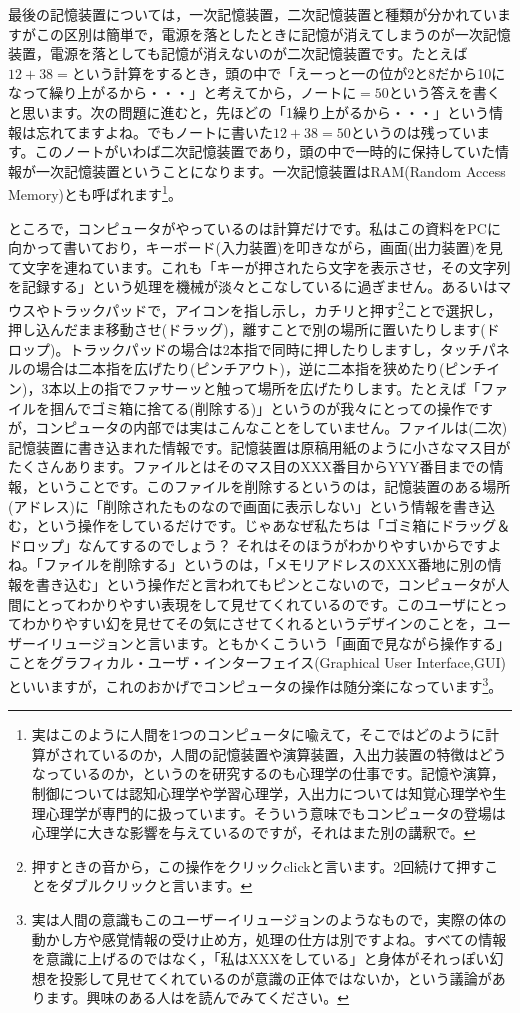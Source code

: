 \documentclass{ltjsbook}
\begin{document}
最後の記憶装置については，一次記憶装置，二次記憶装置と種類が分かれていますがこの区別は簡単で，電源を落としたときに記憶が消えてしまうのが一次記憶装置，電源を落としても記憶が消えないのが二次記憶装置です。たとえば$12+38=$という計算をするとき，頭の中で「えーっと一の位が2と8だから10になって繰り上がるから・・・」と考えてから，ノートに$=50$という答えを書くと思います。次の問題に進むと，先ほどの「1繰り上がるから・・・」という情報は忘れてますよね。でもノートに書いた$12+38=50$というのは残っています。このノートがいわば二次記憶装置であり，頭の中で一時的に保持していた情報が一次記憶装置ということになります。一次記憶装置はRAM(Random Access Memory)とも呼ばれます\footnote{実はこのように人間を1つのコンピュータに喩えて，そこではどのように計算がされているのか，人間の記憶装置や演算装置，入出力装置の特徴はどうなっているのか，というのを研究するのも心理学の仕事です。記憶や演算，制御については認知心理学や学習心理学，入出力については知覚心理学や生理心理学が専門的に扱っています。そういう意味でもコンピュータの登場は心理学に大きな影響を与えているのですが，それはまた別の講釈で。}。

ところで，コンピュータがやっているのは計算だけです。私はこの資料をPCに向かって書いており，キーボード(入力装置)を叩きながら，画面(出力装置)を見て文字を連ねています。これも「キーが押されたら文字を表示させ，その文字列を記録する」という処理を機械が淡々とこなしているに過ぎません。あるいはマウスやトラックパッドで，アイコンを指し示し，カチリと押す\footnote{押すときの音から，この操作をクリックclickと言います。2回続けて押すことをダブルクリックと言います。}ことで選択し，押し込んだまま移動させ(ドラッグ)，離すことで別の場所に置いたりします(ドロップ)。トラックパッドの場合は2本指で同時に押したりしますし，タッチパネルの場合は二本指を広げたり(ピンチアウト)，逆に二本指を狭めたり(ピンチイン)，3本以上の指でファサーッと触って場所を広げたりします。たとえば「ファイルを掴んでゴミ箱に捨てる(削除する)」というのが我々にとっての操作ですが，コンピュータの内部では実はこんなことをしていません。ファイルは(二次)記憶装置に書き込まれた情報です。記憶装置は原稿用紙のように小さなマス目がたくさんあります。ファイルとはそのマス目のXXX番目からYYY番目までの情報，ということです。このファイルを削除するというのは，記憶装置のある場所(アドレス)に「削除されたものなので画面に表示しない」という情報を書き込む，という操作をしているだけです。じゃあなぜ私たちは「ゴミ箱にドラッグ＆ドロップ」なんてするのでしょう？ それはそのほうがわかりやすいからですよね。「ファイルを削除する」というのは，「メモリアドレスのXXX番地に別の情報を書き込む」という操作だと言われてもピンとこないので，コンピュータが人間にとってわかりやすい表現をして見せてくれているのです。このユーザにとってわかりやすい幻を見せてその気にさせてくれるというデザインのことを，ユーザーイリュージョンと言います。ともかくこういう「画面で見ながら操作する」ことをグラフィカル・ユーザ・インターフェイス(Graphical User Interface,GUI)といいますが，これのおかげでコンピュータの操作は随分楽になっています\footnote{実は人間の意識もこのユーザーイリュージョンのようなもので，実際の体の動かし方や感覚情報の受け止め方，処理の仕方は別ですよね。すべての情報を意識に上げるのではなく，「私はXXXをしている」と身体がそれっぽい幻想を投影して見せてくれているのが意識の正体ではないか，という議論があります。興味のある人は\textcite{UserIlluision2002}を読んでみてください。}。
\end{document}
